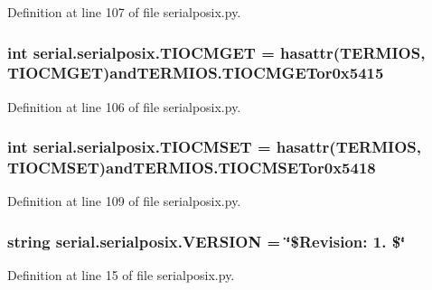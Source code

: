 Definition at line 107 of file serialposix.\+py.

\subsubsection[{\texorpdfstring{T\+I\+O\+C\+M\+G\+ET}{TIOCMGET}}]{\setlength{\rightskip}{0pt plus 5cm}int serial.\+serialposix.\+T\+I\+O\+C\+M\+G\+ET = hasattr({\bf T\+E\+R\+M\+I\+OS}, \textquotesingle{}T\+I\+O\+C\+M\+G\+ET\textquotesingle{})and\+T\+E\+R\+M\+I\+O\+S.\+T\+I\+O\+C\+M\+G\+E\+Tor0x5415}\hypertarget{namespaceserial_1_1serialposix_a98ced6ed92112069444b366824052568}{}\label{namespaceserial_1_1serialposix_a98ced6ed92112069444b366824052568}


Definition at line 106 of file serialposix.\+py.

\subsubsection[{\texorpdfstring{T\+I\+O\+C\+M\+S\+ET}{TIOCMSET}}]{\setlength{\rightskip}{0pt plus 5cm}int serial.\+serialposix.\+T\+I\+O\+C\+M\+S\+ET = hasattr({\bf T\+E\+R\+M\+I\+OS}, \textquotesingle{}T\+I\+O\+C\+M\+S\+ET\textquotesingle{})and\+T\+E\+R\+M\+I\+O\+S.\+T\+I\+O\+C\+M\+S\+E\+Tor0x5418}\hypertarget{namespaceserial_1_1serialposix_aae5eff0b04208edfd40f9c0ea5f8d306}{}\label{namespaceserial_1_1serialposix_aae5eff0b04208edfd40f9c0ea5f8d306}


Definition at line 109 of file serialposix.\+py.

\subsubsection[{\texorpdfstring{V\+E\+R\+S\+I\+ON}{VERSION}}]{\setlength{\rightskip}{0pt plus 5cm}string serial.\+serialposix.\+V\+E\+R\+S\+I\+ON = \char`\"{}\$Revision\+: 1. \$\char`\"{}}\hypertarget{namespaceserial_1_1serialposix_ae5b92bdc83f9cab4a0f9541ea2e09fa5}{}\label{namespaceserial_1_1serialposix_ae5b92bdc83f9cab4a0f9541ea2e09fa5}


Definition at line 15 of file serialposix.\+py.

